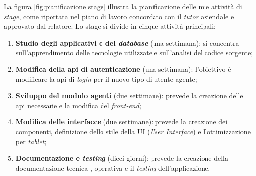 La figura \ref{fig:pianificazione stage} illustra la pianificazione delle mie attività di \textit{stage},
come riportata nel piano di lavoro concordato con il \textit{tutor} aziendale e approvato dal relatore.
Lo stage si divide in cinque attività principali:
\begin{enumerate}
      \item \textbf{Studio degli applicativi e del \textit{database}} (una settimana): si concentra sull'apprendimento
            delle tecnologie utilizzate e sull'analisi del codice sorgente;
      \item \textbf{Modifica della \gls{api} di autenticazione} (una settimana): l'obiettivo è modificare la \gls{api} di 
           \textit{login} per il nuovo tipo di utente agente;
      \item \textbf{Sviluppo del modulo agenti} (due settimane): prevede la creazione delle \gls{api} necessarie
            e la modifica del \textit{front-end};
      \item \textbf{Modifica delle interfacce} (due settimane): prevede la creazione dei componenti, definizione
            dello stile della UI (\textit{User Interface}) e l'ottimizzazione per \textit{tablet};
      \item \textbf{Documentazione e \textit{testing}} (dieci giorni): prevede la creazione della documentazione tecnica 
            , operativa e il \textit{testing} dell'applicazione.
\end{enumerate}